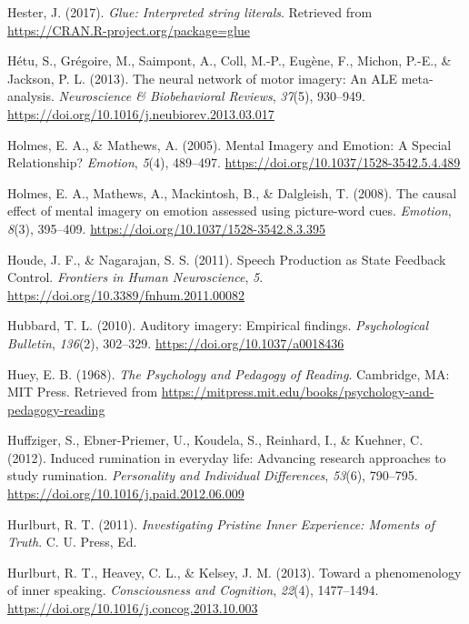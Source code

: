 \documentclass[a4paper,12pt,twoside,openright,oldfontcommands]{memoir}
\begin{document}
\leavevmode\hypertarget{ref-R-glue}{}%
Hester, J. (2017). \emph{Glue: Interpreted string literals}. Retrieved from \url{https://CRAN.R-project.org/package=glue}

\leavevmode\hypertarget{ref-hetu_neural_2013}{}%
Hétu, S., Grégoire, M., Saimpont, A., Coll, M.-P., Eugène, F., Michon, P.-E., \& Jackson, P. L. (2013). The neural network of motor imagery: An ALE meta-analysis. \emph{Neuroscience \& Biobehavioral Reviews}, \emph{37}(5), 930--949. \url{https://doi.org/10.1016/j.neubiorev.2013.03.017}

\leavevmode\hypertarget{ref-holmes_mental_2005}{}%
Holmes, E. A., \& Mathews, A. (2005). Mental Imagery and Emotion: A Special Relationship? \emph{Emotion}, \emph{5}(4), 489--497. \url{https://doi.org/10.1037/1528-3542.5.4.489}

\leavevmode\hypertarget{ref-holmes_causal_2008}{}%
Holmes, E. A., Mathews, A., Mackintosh, B., \& Dalgleish, T. (2008). The causal effect of mental imagery on emotion assessed using picture-word cues. \emph{Emotion}, \emph{8}(3), 395--409. \url{https://doi.org/10.1037/1528-3542.8.3.395}

\leavevmode\hypertarget{ref-houde_speech_2011}{}%
Houde, J. F., \& Nagarajan, S. S. (2011). Speech Production as State Feedback Control. \emph{Frontiers in Human Neuroscience}, \emph{5}. \url{https://doi.org/10.3389/fnhum.2011.00082}

\leavevmode\hypertarget{ref-hubbard_auditory_2010}{}%
Hubbard, T. L. (2010). Auditory imagery: Empirical findings. \emph{Psychological Bulletin}, \emph{136}(2), 302--329. \url{https://doi.org/10.1037/a0018436}

\leavevmode\hypertarget{ref-huey_psychology_1968}{}%
Huey, E. B. (1968). \emph{The Psychology and Pedagogy of Reading}. Cambridge, MA: MIT Press. Retrieved from \url{https://mitpress.mit.edu/books/psychology-and-pedagogy-reading}

\leavevmode\hypertarget{ref-Huffziger2012}{}%
Huffziger, S., Ebner-Priemer, U., Koudela, S., Reinhard, I., \& Kuehner, C. (2012). Induced rumination in everyday life: Advancing research approaches to study rumination. \emph{Personality and Individual Differences}, \emph{53}(6), 790--795. \url{https://doi.org/10.1016/j.paid.2012.06.009}

\leavevmode\hypertarget{ref-Hurlburt2011}{}%
Hurlburt, R. T. (2011). \emph{Investigating Pristine Inner Experience: Moments of Truth}. C. U. Press, Ed.

\leavevmode\hypertarget{ref-Hurlburt2013}{}%
Hurlburt, R. T., Heavey, C. L., \& Kelsey, J. M. (2013). Toward a phenomenology of inner speaking. \emph{Consciousness and Cognition}, \emph{22}(4), 1477--1494. \url{https://doi.org/10.1016/j.concog.2013.10.003}
\end{document}
